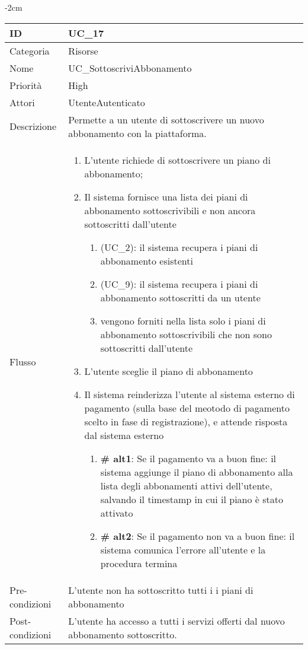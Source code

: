 \begin{center}
\begin{table}[bp]
    \centering
    \addtolength{\leftskip} {-2cm}
\begin{tabular}{ |p{2.6cm}|p{13cm}|  }
\hline
ID & UC\_17 \\\hline
Categoria & Risorse\\\hline
Nome & UC\_SottoscriviAbbonamento\\\hline
Priorità & High \\\hline
Attori &  UtenteAutenticato \\\hline
Descrizione & Permette a un utente di sottoscrivere un nuovo abbonamento con la piattaforma.\\\hline
Flusso &  	\begin{enumerate}
			\item L'utente richiede di sottoscrivere un piano di abbonamento;
			\item Il sistema fornisce una lista dei piani di abbonamento sottoscrivibili e non ancora sottoscritti dall'utente
				\begin{enumerate}[  ]
				\item (UC\_2): il sistema recupera i piani di abbonamento esistenti
				\item (UC\_9): il sistema recupera i piani di abbonamento sottoscritti da un utente
				\item vengono forniti nella lista solo i piani di abbonamento sottoscrivibili che non sono sottoscritti dall'utente
				\end{enumerate}
			\item L'utente sceglie il piano di abbonamento
			\item Il sistema reinderizza l'utente al sistema esterno di pagamento (sulla base del meotodo di pagamento scelto in fase di registrazione), e attende risposta dal sistema esterno
			\begin{enumerate}[  ]
				\item \textbf{\# alt1}: Se il pagamento va a buon fine: il sistema aggiunge il piano di abbonamento alla lista degli abbonamenti attivi dell'utente, salvando il timestamp in cui il piano è stato attivato
				\item \textbf{\# alt2}: Se il pagamento non va a buon fine: il sistema comunica l'errore all'utente e la procedura termina
			\end{enumerate}
		\end{enumerate}\\\hline
Pre-condizioni & L'utente non ha sottoscritto tutti i i piani di abbonamento\\\hline
Post-condizioni &  L'utente ha accesso a tutti i servizi offerti dal nuovo abbonamento sottoscritto.\\\hline
\end{tabular}
\label{table_use_case:17}\newline
\end{table}


\end{center}
